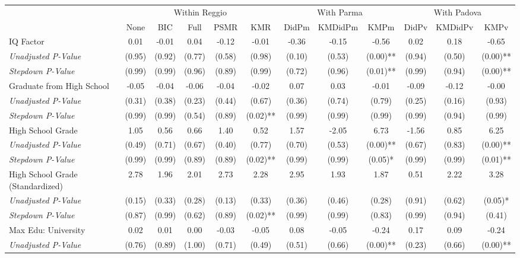 \begin{tabular}{l c c c c c c c c c c c}
\toprule
& \multicolumn{5}{c}{Within Reggio} & \multicolumn{3}{c}{With Parma} & \multicolumn{3}{c}{With Padova} \\\cmidrule(lr){2-6} \cmidrule(lr){7-9} \cmidrule(lr){10-12}
 & None & BIC & Full & PSMR & KMR & DidPm & KMDidPm & KMPm & DidPv & KMDidPv & KMPv \\
\midrule
IQ Factor & 0.01 & -0.01 & 0.04 & -0.12 & -0.01 & -0.36 & -0.15 & -0.56 & 0.02 & 0.18 & -0.65 \\
\quad \textit{Unadjusted P-Value} & (0.95) & (0.92) & (0.77) & (0.58) & (0.98) & (0.10) & (0.53) & (0.00)** & (0.94) & (0.50) & (0.00)** \\
\quad \textit{Stepdown P-Value} & (0.99) & (0.99) & (0.96) & (0.89) & (0.99) & (0.72) & (0.96) & (0.01)** & (0.99) & (0.94) & (0.00)** \\
Graduate from High School & -0.05 & -0.04 & -0.06 & -0.04 & -0.02 & 0.07 & 0.03 & -0.01 & -0.09 & -0.12 & -0.00 \\
\quad \textit{Unadjusted P-Value} & (0.31) & (0.38) & (0.23) & (0.44) & (0.67) & (0.36) & (0.74) & (0.79) & (0.25) & (0.16) & (0.93) \\
\quad \textit{Stepdown P-Value} & (0.99) & (0.99) & (0.54) & (0.89) & (0.02)** & (0.99) & (0.99) & (0.99) & (0.99) & (0.94) & (0.99) \\
High School Grade & 1.05 & 0.56 & 0.66 & 1.40 & 0.52 & 1.57 & -2.05 & 6.73 & -1.56 & 0.85 & 6.25 \\
\quad \textit{Unadjusted P-Value} & (0.49) & (0.71) & (0.67) & (0.40) & (0.77) & (0.70) & (0.53) & (0.00)** & (0.67) & (0.83) & (0.00)** \\
\quad \textit{Stepdown P-Value} & (0.99) & (0.99) & (0.89) & (0.89) & (0.02)** & (0.99) & (0.99) & (0.05)* & (0.99) & (0.99) & (0.01)** \\
High School Grade (Standardized) & 2.78 & 1.96 & 2.01 & 2.73 & 2.28 & 2.95 & 1.93 & 1.87 & 0.51 & 2.22 & 3.28 \\
\quad \textit{Unadjusted P-Value} & (0.15) & (0.33) & (0.28) & (0.13) & (0.33) & (0.36) & (0.46) & (0.28) & (0.91) & (0.62) & (0.05)* \\
\quad \textit{Stepdown P-Value} & (0.87) & (0.99) & (0.62) & (0.89) & (0.02)** & (0.99) & (0.99) & (0.83) & (0.99) & (0.94) & (0.41) \\
Max Edu: University & 0.02 & 0.01 & 0.00 & -0.03 & -0.05 & 0.08 & -0.05 & -0.24 & 0.17 & 0.09 & -0.24 \\
\quad \textit{Unadjusted P-Value} & (0.76) & (0.89) & (1.00) & (0.71) & (0.49) & (0.51) & (0.66) & (0.00)** & (0.23) & (0.66) & (0.00)** \\

\end{tabular}
